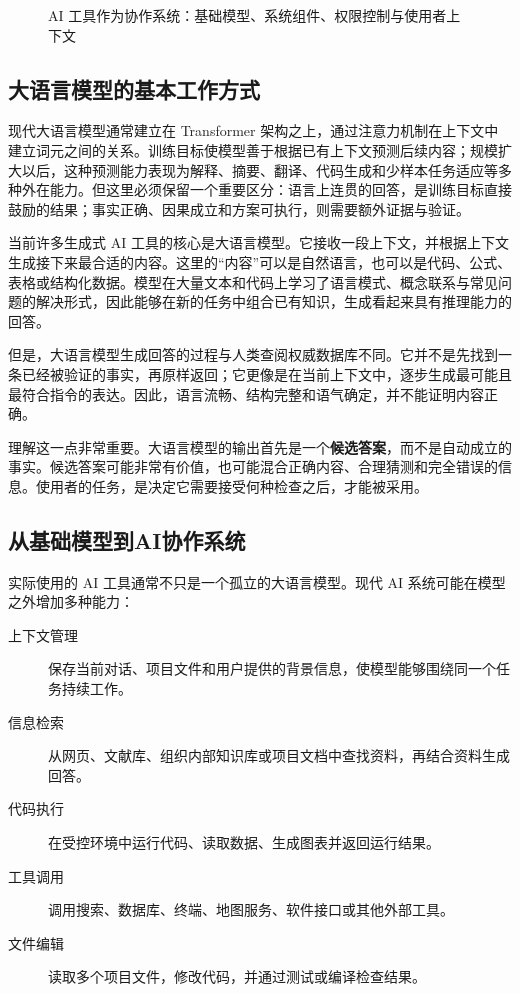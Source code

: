 \begin{figure}[H]
  \centering
  \caption{AI 工具作为协作系统：基础模型、系统组件、权限控制与使用者上下文}
  \label{fig:ch01_system}
\end{figure}

\subsection{大语言模型的基本工作方式}

现代大语言模型通常建立在 Transformer 架构之上，通过注意力机制在上下文中建立词元之间的关系\cite{vaswani2017attention}。训练目标使模型善于根据已有上下文预测后续内容；规模扩大以后，这种预测能力表现为解释、摘要、翻译、代码生成和少样本任务适应等多种外在能力\cite{brown2020language}。但这里必须保留一个重要区分：语言上连贯的回答，是训练目标直接鼓励的结果；事实正确、因果成立和方案可执行，则需要额外证据与验证。

当前许多生成式 AI 工具的核心是大语言模型。它接收一段上下文，并根据上下文生成接下来最合适的内容。这里的“内容”可以是自然语言，也可以是代码、公式、表格或结构化数据。模型在大量文本和代码上学习了语言模式、概念联系与常见问题的解决形式，因此能够在新的任务中组合已有知识，生成看起来具有推理能力的回答。

但是，大语言模型生成回答的过程与人类查阅权威数据库不同。它并不是先找到一条已经被验证的事实，再原样返回；它更像是在当前上下文中，逐步生成最可能且最符合指令的表达。因此，语言流畅、结构完整和语气确定，并不能证明内容正确。

理解这一点非常重要。大语言模型的输出首先是一个\textbf{候选答案}，而不是自动成立的事实。候选答案可能非常有价值，也可能混合正确内容、合理猜测和完全错误的信息。使用者的任务，是决定它需要接受何种检查之后，才能被采用。

\subsection{从基础模型到AI协作系统}

实际使用的 AI 工具通常不只是一个孤立的大语言模型。现代 AI 系统可能在模型之外增加多种能力：

\begin{description}
  \item[上下文管理] 保存当前对话、项目文件和用户提供的背景信息，使模型能够围绕同一个任务持续工作。
  \item[信息检索] 从网页、文献库、组织内部知识库或项目文档中查找资料，再结合资料生成回答。
  \item[代码执行] 在受控环境中运行代码、读取数据、生成图表并返回运行结果。
  \item[工具调用] 调用搜索、数据库、终端、地图服务、软件接口或其他外部工具。
  \item[文件编辑] 读取多个项目文件，修改代码，并通过测试或编译检查结果。
\end{description}

